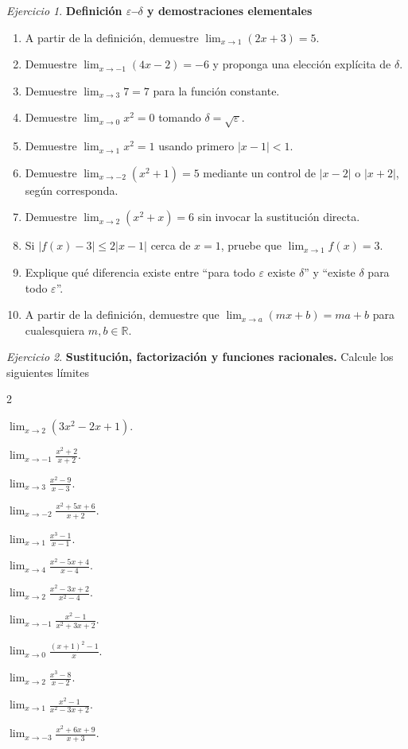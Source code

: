 \documentclass[12pt]{article}
\theoremstyle{remark}
\newtheorem{Ejer}{Ejercicio}
\newcommand{\R}{\mathbb{R}}
\begin{document}
\begin{Ejer}\textbf{Definición $\varepsilon$--$\delta$ y demostraciones elementales}
\begin{enumerate}[resume=banco]
\item A partir de la definición, demuestre $\lim_{x\to1}(2x+3)=5$.
\item Demuestre $\lim_{x\to-1}(4x-2)=-6$ y proponga una elección explícita de $\delta$.
\item Demuestre $\lim_{x\to3}7=7$ para la función constante.
\item Demuestre $\lim_{x\to0}x^2=0$ tomando $\delta=\sqrt{\varepsilon}$.
\item Demuestre $\lim_{x\to1}x^2=1$ usando primero $|x-1|<1$.
\item Demuestre $\lim_{x\to-2}(x^2+1)=5$ mediante un control de $|x-2|$ o $|x+2|$, según corresponda.
\item Demuestre $\lim_{x\to2}(x^2+x)=6$ sin invocar la sustitución directa.
\item Si $|f(x)-3|\le2|x-1|$ cerca de $x=1$, pruebe que $\lim_{x\to1}f(x)=3$.
\item Explique qué diferencia existe entre ``para todo $\varepsilon$ existe $\delta$'' y ``existe $\delta$ para todo $\varepsilon$''.
\item A partir de la definición, demuestre que $\lim_{x\to a}(mx+b)=ma+b$ para cualesquiera $m,b\in\R$.
\end{enumerate}
\end{Ejer}

\begin{Ejer}\textbf{Sustitución, factorización y funciones racionales.} Calcule los siguientes l\'imites
\begin{enumerate}[resume=banco]
\begin{multicols}{2}
\item  $\displaystyle\lim_{x\to2}(3x^2-2x+1)$.
\item  $\displaystyle\lim_{x\to-1}\frac{x^2+2}{x+2}$.
\item  $\displaystyle\lim_{x\to3}\frac{x^2-9}{x-3}$.
\item  $\displaystyle\lim_{x\to-2}\frac{x^2+5x+6}{x+2}$.
\item  $\displaystyle\lim_{x\to1}\frac{x^3-1}{x-1}$.
\item  $\displaystyle\lim_{x\to4}\frac{x^2-5x+4}{x-4}$.
\item  $\displaystyle\lim_{x\to2}\frac{x^2-3x+2}{x^2-4}$.
\item  $\displaystyle\lim_{x\to-1}\frac{x^2-1}{x^2+3x+2}$.
\item  $\displaystyle\lim_{x\to0}\frac{(x+1)^2-1}{x}$.
\item  $\displaystyle\lim_{x\to2}\frac{x^3-8}{x-2}$.
\item  $\displaystyle\lim_{x\to1}\frac{x^2-1}{x^2-3x+2}$.
\item  $\displaystyle\lim_{x\to-3}\frac{x^2+6x+9}{x+3}$.
\end{multicols}
\end{enumerate}
\end{Ejer}
\end{document}
